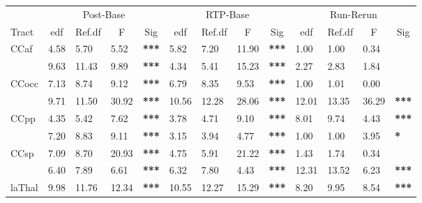 \begin{tabular}{lllll|llll|llll}
 & \multicolumn{4}{c|}{Post-Base} & \multicolumn{4}{c|}{RTP-Base} & \multicolumn{4}{c}{Run-Rerun} \\ \cline{2-13}
Tract & \multicolumn{1}{c}{edf} & \multicolumn{1}{c}{Ref.df} & \multicolumn{1}{c}{F} & \multicolumn{1}{c|}{Sig} & \multicolumn{1}{c}{edf} & \multicolumn{1}{c}{Ref.df} & \multicolumn{1}{c}{F} & \multicolumn{1}{c|}{Sig} & \multicolumn{1}{c}{edf} & \multicolumn{1}{c}{Ref.df} & \multicolumn{1}{c}{F} & \multicolumn{1}{c}{Sig} \\ \hline
\multicolumn{1}{l|}{CCaf} & 4.58 & 5.70 & 5.52 & \textbf{***} & 5.82 & 7.20 & 11.90 & \textbf{***} & 1.00 & 1.00 & 0.34 & \textbf{} \\
\rowcolor[HTML]{C0C0C0}
\multicolumn{1}{l|}{\cellcolor[HTML]{C0C0C0}CCmot} & 9.63 & 11.43 & 9.89 & \textbf{***} & 4.34 & 5.41 & 15.23 & \textbf{***} & 2.27 & 2.83 & 1.84 & \textbf{} \\
\multicolumn{1}{l|}{CCocc} & 7.13 & 8.74 & 9.12 & \textbf{***} & 6.79 & 8.35 & 9.53 & \textbf{***} & 1.00 & 1.01 & \cellcolor[HTML]{FFFFFF}0.00 & \textbf{} \\
\rowcolor[HTML]{C0C0C0}
\multicolumn{1}{l|}{\cellcolor[HTML]{C0C0C0}CCorb} & 9.71 & 11.50 & 30.92 & \textbf{***} & 10.56 & 12.28 & 28.06 & \textbf{***} & 12.01 & 13.35 & 36.29 & \textbf{***} \\
\multicolumn{1}{l|}{CCpp} & 4.35 & 5.42 & 7.62 & \textbf{***} & 3.78 & 4.71 & 9.10 & \textbf{***} & 8.01 & 9.74 & 4.43 & \textbf{***} \\
\rowcolor[HTML]{C0C0C0}
\multicolumn{1}{l|}{\cellcolor[HTML]{C0C0C0}CCsf} & 7.20 & 8.83 & 9.11 & \textbf{***} & 3.15 & 3.94 & 4.77 & \textbf{***} & 1.00 & 1.00 & 3.95 & \textbf{*} \\
\multicolumn{1}{l|}{CCsp} & 7.09 & 8.70 & 20.93 & \textbf{***} & 4.75 & 5.91 & 21.22 & \textbf{***} & 1.43 & 1.74 & 0.34 & \textbf{} \\
\rowcolor[HTML]{C0C0C0}
\multicolumn{1}{l|}{\cellcolor[HTML]{C0C0C0}CCtemp} & 6.40 & 7.89 & 6.61 & \textbf{***} & 6.32 & 7.80 & 4.43 & \textbf{***} & 12.31 & 13.52 & 6.23 & \textbf{***} \\
\multicolumn{1}{l|}{laThal} & 9.98 & 11.76 & 12.34 & \textbf{***} & 10.55 & 12.27 & 15.29 & \textbf{***} & 8.20 & 9.95 & 8.54 & \textbf{***} \\

\end{tabular}
